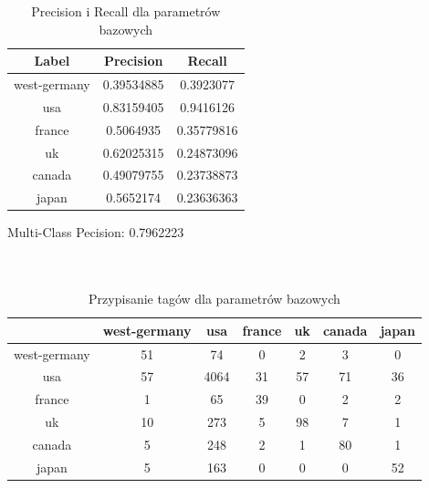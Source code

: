 \documentclass{classrep}
\begin{document}
\begin{table}[H]
\begin{tabular}{|c|c|c|}
\hline
Label        & Precision  & Recall     \\ \hline
west-germany & 0.39534885 & 0.3923077  \\ \hline
usa          & 0.83159405 & 0.9416126  \\ \hline
france       & 0.5064935  & 0.35779816 \\ \hline
uk           & 0.62025315 & 0.24873096 \\ \hline
canada       & 0.49079755 & 0.23738873 \\ \hline
japan        & 0.5652174  & 0.23636363 \\ \hline
\end{tabular}
\caption{Precision i Recall dla parametrów bazowych}
\end{table}
Multi-Class Pecision: 0.7962223\\
\\
\\
\begin{table}[H]
\begin{tabular}{|c|c|c|c|c|c|c|}
\hline
             & west-germany & usa  & france & uk & canada & japan \\ \hline
west-germany & 51           & 74   & 0      & 2  & 3      & 0     \\ \hline
usa          & 57           & 4064 & 31     & 57 & 71     & 36    \\ \hline
france       & 1            & 65   & 39     & 0  & 2      & 2     \\ \hline
uk           & 10           & 273  & 5      & 98 & 7      & 1     \\ \hline
canada       & 5            & 248  & 2      & 1  & 80     & 1     \\ \hline
japan        & 5            & 163  & 0      & 0  & 0      & 52    \\ \hline
\end{tabular}
\caption{Przypisanie tagów dla parametrów bazowych}
\end{table}
\end{document}
